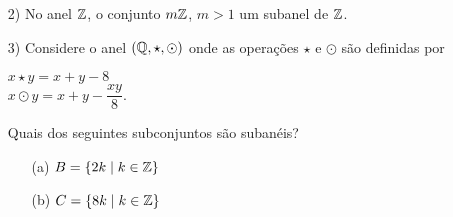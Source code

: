 \documentclass{beamer}
\begin{document}
    \begin{frame}
        \begin{exemplos}
            \begin{enumerate}
                \item[2)] No anel $\mathbb{Z}$, \pause o conjunto $m\mathbb{Z}$, $m > 1$  um subanel de $\mathbb{Z}$.\pause

                \vspace{5cm}
            \end{enumerate}
        \end{exemplos}
    \end{frame}

    \begin{frame}
        \begin{exemplos}
            \begin{enumerate}
                \item[3)] Considere o anel $(\mathbb{Q}, \star, \odot)$ \pause onde as opera\c{c}\~oes $\star$ e $\odot$ são definidas por\pause
                \begin{center}
                    $x \star y = x + y - 8$\\\pause
                    $x \odot y = x + y - \dfrac{xy}{8}.$\pause
                \end{center}
                Quais dos seguintes subconjuntos s\~ao suban\'eis?\pause
                \begin{enumerate}
                    \item[(a)] $B = \{2k \mid k \in \mathbb{Z}\}$\pause

                    \vspace{.5cm}

                    \item[(b)] $C = \{8k \mid k \in \mathbb{Z}\}$\pause
                    \vspace{.5cm}
                \end{enumerate}
            \end{enumerate}
        \end{exemplos}
    \end{frame}
\end{document}
